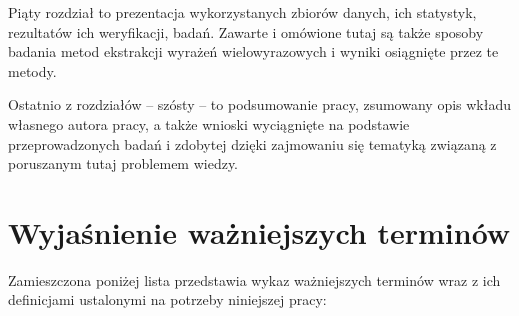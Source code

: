\par
Piąty rozdział to prezentacja wykorzystanych zbiorów danych, ich statystyk, rezultatów ich weryfikacji, badań.
Zawarte i omówione tutaj są także sposoby badania metod ekstrakcji wyrażeń wielowyrazowych i wyniki osiągnięte przez te metody.

\par
Ostatnio z rozdziałów -- szósty -- to podsumowanie pracy, zsumowany opis wkładu własnego autora pracy, a także wnioski wyciągnięte na podstawie przeprowadzonych badań i zdobytej dzięki zajmowaniu się tematyką związaną z poruszanym tutaj problemem wiedzy.


\section{Wyjaśnienie ważniejszych terminów}
Zamieszczona poniżej lista przedstawia wykaz ważniejszych terminów wraz z ich definicjami ustalonymi na potrzeby niniejszej pracy:

